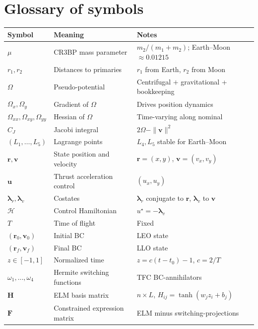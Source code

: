 \documentclass[8pt,a4paper]{article}
\newcommand{\bvec}[1]{\bm{#1}}
\newcommand{\uvec}{\bvec{u}}
\newcommand{\lamr}{\bvec{\lambda}_r}
\newcommand{\lamv}{\bvec{\lambda}_v}
\newcommand{\Omegaxx}{\Omega_{xx}}
\newcommand{\Omegayy}{\Omega_{yy}}
\newcommand{\Omegaxy}{\Omega_{xy}}
\newcommand{\Fmat}{\bvec{F}}
\newcommand{\Hmat}{\bvec{H}}
\theoremstyle{definition}
\theoremstyle{remark}
\begin{document}
\section{Glossary of symbols}

\begin{center}
\begin{tabular}{llp{7cm}}
  \toprule
  Symbol & Meaning & Notes \\
  \midrule
  $\mu$ & CR3BP mass parameter & $m_2/(m_1+m_2)$; Earth--Moon $\approx 0.01215$ \\
  $r_1, r_2$ & Distances to primaries & $r_1$ from Earth, $r_2$ from Moon \\
  $\Omega$ & Pseudo-potential & Centrifugal $+$ gravitational + bookkeeping \\
  $\Omega_x, \Omega_y$ & Gradient of $\Omega$ & Drives position dynamics \\
  $\Omegaxx, \Omegaxy, \Omegayy$ & Hessian of $\Omega$ & Time-varying along nominal \\
  $C_J$ & Jacobi integral & $2\Omega - \|\bvec{v}\|^2$ \\
  $(L_1, \dots, L_5)$ & Lagrange points & $L_4, L_5$ stable for Earth--Moon \\
  \midrule
  $\bvec{r}, \bvec{v}$ & State position and velocity & $\bvec{r}=(x,y)$, $\bvec{v}=(v_x,v_y)$ \\
  $\uvec$ & Thrust acceleration control & $(u_x, u_y)$ \\
  $\lamr, \lamv$ & Costates & $\lamr$ conjugate to $\bvec r$, $\lamv$ to $\bvec v$ \\
  $\mathcal H$ & Control Hamiltonian & $u^\star = -\lamv$ \\
  $T$ & Time of flight & Fixed \\
  $(\bvec r_0, \bvec v_0)$ & Initial BC & LEO state \\
  $(\bvec r_f, \bvec v_f)$ & Final BC & LLO state \\
  \midrule
  $z \in [-1, 1]$ & Normalized time & $z = c(t - t_0) - 1$, $c = 2/T$ \\
  $\omega_1, \dots, \omega_4$ & Hermite switching functions & TFC BC-annihilators \\
  $\Hmat$ & ELM basis matrix & $n \times L$, $H_{ij} = \tanh(w_j z_i + b_j)$ \\
  $\Fmat$ & Constrained expression matrix & ELM minus switching-projections \\

\end{tabular}
\end{center}
\end{document}
